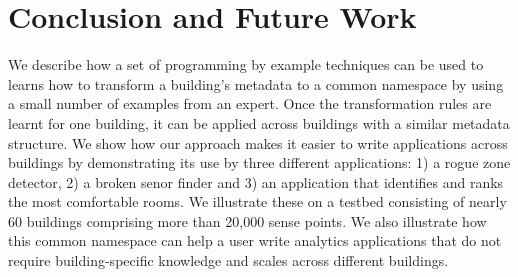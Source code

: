 \section{Conclusion and Future Work}

We describe how a set of programming by example techniques can be used to
 learns how to transform a building's metadata 
to a common namespace by using a small number of examples from an expert. Once the transformation 
rules are learnt for one building, it can be applied across buildings with a similar 
metadata structure.  
We show how our approach makes it easier to write applications across buildings by
demonstrating its use by three different applications: 1) a rogue zone detector, 2)
a broken senor finder and 3) an application that identifies and ranks the most comfortable
rooms. We illustrate these on a testbed consisting of nearly 60 buildings comprising more 
than 20,000 sense points. We also illustrate how this common namespace can help a user write 
analytics applications that do not require building-specific knowledge and scales across 
different buildings.


